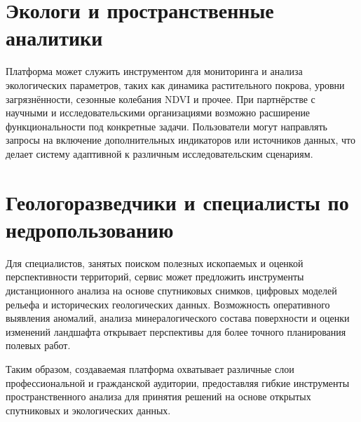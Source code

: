 \section*{Экологи и пространственные аналитики}

Платформа может служить инструментом для мониторинга и анализа экологических параметров, таких как динамика растительного покрова, уровни загрязнённости, сезонные колебания NDVI и прочее. При партнёрстве с научными и исследовательскими организациями возможно расширение функциональности под конкретные задачи. Пользователи могут направлять запросы на включение дополнительных индикаторов или источников данных, что делает систему адаптивной к различным исследовательским сценариям.

\section*{Геологоразведчики и специалисты по недропользованию}

Для специалистов, занятых поиском полезных ископаемых и оценкой перспективности территорий, сервис может предложить инструменты дистанционного анализа на основе спутниковых снимков, цифровых моделей рельефа и исторических геологических данных. Возможность оперативного выявления аномалий, анализа минералогического состава поверхности и оценки изменений ландшафта открывает перспективы для более точного планирования полевых работ.

Таким образом, создаваемая платформа охватывает различные слои профессиональной и гражданской аудитории, предоставляя гибкие инструменты пространственного анализа для принятия решений на основе открытых спутниковых и экологических данных.
